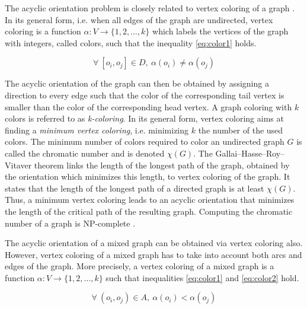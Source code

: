 The acyclic orientation problem is closely related to vertex coloring of a graph \cite{jensen:2011}. In its general form, i.e. when all edges of the graph are undirected, vertex coloring is a function $\alpha: V \rightarrow \{1, 2, \ldots, k\}$ which labels the vertices of the graph with integers, called colors, such that the inequality \ref{eq:color1} holds.

\begin{equation}
\forall\ [o_i,o_j] \in D,\ \alpha(o_i) \neq \alpha(o_j)
\label{eq:color1}
\end{equation}

The acyclic orientation of the graph can then be obtained by assigning a direction to every edge such that the color of the corresponding tail vertex is smaller than the color of the corresponding head vertex. A graph coloring with $k$ colors is referred to as \textit{k-coloring}. In its general form, vertex coloring aims at finding a \textit{minimum vertex coloring}, i.e. minimizing $k$ the number of the used colors. The minimum number of colors required to color an undirected graph $G$ is called the chromatic number and is denoted $\chi(G)$. The Gallai–Hasse–Roy–Vitaver theorem \cite{gallai:1968,roy:1967,hasse:1966,vitaver:1962} links the length of the longest path of the graph, obtained by the orientation which minimizes this length, to vertex coloring of the graph. It states that the length of the longest path of a directed graph is at least $\chi(G)$. Thus, a minimum vertex coloring leads to an acyclic orientation that minimizes the length of the critical path of the resulting graph. Computing the chromatic number of a graph is NP-complete \cite{karp:1972}.

The acyclic orientation of a mixed graph can be obtained via vertex coloring also. However, vertex coloring of a mixed graph has to take into account both arcs and edges of the graph. More precisely, a vertex coloring of a mixed graph is a function $\alpha: V \rightarrow \{1, 2, \ldots, k\}$ such that inequalities \ref{eq:color1} and \ref{eq:color2} hold.

\begin{equation}
\forall\ (o_i,o_j) \in A,\ \alpha(o_i) < \alpha(o_j)
\label{eq:color2}
\end{equation}

